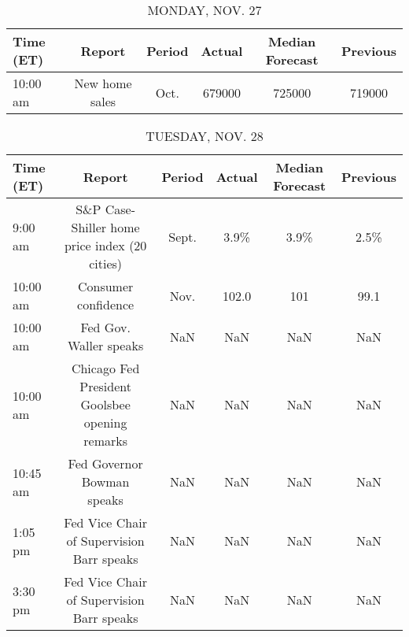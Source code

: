 \documentclass{article}%
\begin{document}
%
\normalsize%


\begin{table}[htbp]%
\caption{MONDAY, NOV. 27}%
\centering%
\begin{adjustbox}{width=1\textwidth}%
\begin{tabular}{lccccc}
\toprule
Time (ET) &         Report & Period & Actual & Median Forecast & Previous \\
\midrule
 10:00 am & New home sales &   Oct. & 679000 &          725000 &   719000 \\
\bottomrule
\end{tabular}
%
\end{adjustbox}%
\end{table}

%


\begin{table}[htbp]%
\caption{TUESDAY, NOV. 28}%
\centering%
\begin{adjustbox}{width=1\textwidth}%
\begin{tabular}{lccccc}
\toprule
Time (ET) &                                         Report & Period & Actual & Median Forecast & Previous \\
\midrule
  9:00 am &  S\&P Case-Shiller home price index (20 cities) &  Sept. &   3.9\% &            3.9\% &     2.5\% \\
 10:00 am &                            Consumer confidence &   Nov. &  102.0 &             101 &     99.1 \\
 10:00 am &                         Fed Gov. Waller speaks &    NaN &    NaN &             NaN &      NaN \\
 10:00 am & Chicago Fed President Goolsbee opening remarks &    NaN &    NaN &             NaN &      NaN \\
 10:45 am &                     Fed Governor Bowman speaks &    NaN &    NaN &             NaN &      NaN \\
  1:05 pm &      Fed Vice Chair of Supervision Barr speaks &    NaN &    NaN &             NaN &      NaN \\
  3:30 pm &      Fed Vice Chair of Supervision Barr speaks &    NaN &    NaN &             NaN &      NaN \\
\bottomrule
\end{tabular}
%
\end{adjustbox}%
\end{table}

%
\end{document}
